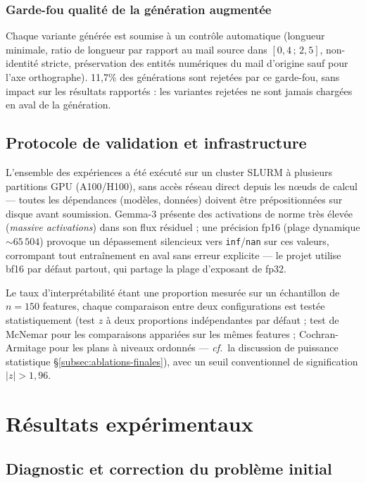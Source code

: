 \documentclass[11pt]{article}
\begin{document}
\subsubsection{Garde-fou qualité de la génération augmentée}
\label{subsec:augmentation}
Chaque variante générée est soumise à un contrôle automatique (longueur
minimale, ratio de longueur par rapport au mail source dans $[0{,}4\,;\,2{,}5]$,
non-identité stricte, préservation des entités numériques du mail d'origine
sauf pour l'axe orthographe). 11,7\% des générations sont rejetées par ce
garde-fou, sans impact sur les résultats rapportés : les variantes rejetées
ne sont jamais chargées en aval de la génération.

\subsection{Protocole de validation et infrastructure}

L'ensemble des expériences a été exécuté sur un cluster SLURM à plusieurs
partitions GPU (A100/H100), sans accès réseau direct depuis les nœuds de
calcul --- toutes les dépendances (modèles, données) doivent être
prépositionnées sur disque avant soumission. Gemma-3 présente des activations
de norme très élevée (\emph{massive activations}) dans son flux résiduel ; une
précision fp16 (plage dynamique $\sim 65\,504$) provoque un dépassement
silencieux vers \texttt{inf}/\texttt{nan} sur ces valeurs, corrompant tout
entraînement en aval sans erreur explicite --- le projet utilise bf16 par
défaut partout, qui partage la plage d'exposant de fp32.

Le taux d'interprétabilité étant une proportion mesurée sur un échantillon de
$n=150$ features, chaque comparaison entre deux configurations est testée
statistiquement (test $z$ à deux proportions indépendantes par défaut ; test de
McNemar pour les comparaisons appariées sur les mêmes features ;
Cochran-Armitage pour les plans à niveaux ordonnés --- \emph{cf.}~la
discussion de puissance statistique \S\ref{subsec:ablations-finales}), avec
un seuil conventionnel de signification $|z| > 1{,}96$.

\newpage
\section{Résultats expérimentaux}
\label{sec:resultats}

\subsection{Diagnostic et correction du problème initial}
\label{subsec:diagnostic-initial}
\end{document}
